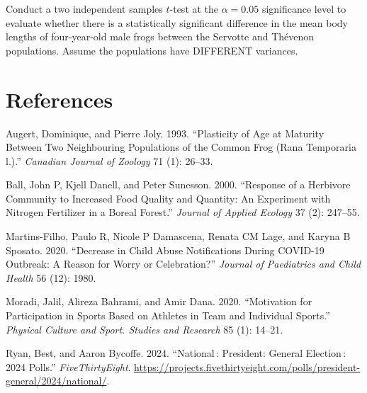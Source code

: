 \documentclass[
]{article}
\newlength{\cslhangindent}
\newenvironment{CSLReferences}[2] %
 {\begin{list}{}{%
  \setlength{\itemindent}{0pt}
  \setlength{\leftmargin}{0pt}
  \setlength{\parsep}{0pt}
  \ifodd #1
   \setlength{\leftmargin}{\cslhangindent}
   \setlength{\itemindent}{-1\cslhangindent}
  \fi
  \setlength{\itemsep}{#2\baselineskip}}}
 {\end{list}}
\begin{document}
Conduct a two independent samples \(t\)-test at the \(\alpha = 0.05\)
significance level to evaluate whether there is a statistically
significant difference in the mean body lengths of four-year-old male
frogs between the Servotte and Thévenon populations. Assume the
populations have DIFFERENT variances.

\newpage

\section*{References}\label{references}

\label{refs}
\begin{CSLReferences}{1}{0}
Augert, Dominique, and Pierre Joly. 1993. {``Plasticity of Age at
Maturity Between Two Neighbouring Populations of the Common Frog (Rana
Temporaria l.).''} \emph{Canadian Journal of Zoology} 71 (1): 26--33.

Ball, John P, Kjell Danell, and Peter Sunesson. 2000. {``Response of a
Herbivore Community to Increased Food Quality and Quantity: An
Experiment with Nitrogen Fertilizer in a Boreal Forest.''} \emph{Journal
of Applied Ecology} 37 (2): 247--55.

Martins-Filho, Paulo R, Nicole P Damascena, Renata CM Lage, and Karyna B
Sposato. 2020. {``Decrease in Child Abuse Notifications During COVID-19
Outbreak: A Reason for Worry or Celebration?''} \emph{Journal of
Paediatrics and Child Health} 56 (12): 1980.

Moradi, Jalil, Alireza Bahrami, and Amir Dana. 2020. {``Motivation for
Participation in Sports Based on Athletes in Team and Individual
Sports.''} \emph{Physical Culture and Sport. Studies and Research} 85
(1): 14--21.

Ryan, Best, and Aaron Bycoffe. 2024. {``National\,: President: General
Election\,: 2024 Polls.''} \emph{FiveThirtyEight}.
\url{https://projects.fivethirtyeight.com/polls/president-general/2024/national/}.

\end{CSLReferences}
\end{document}
